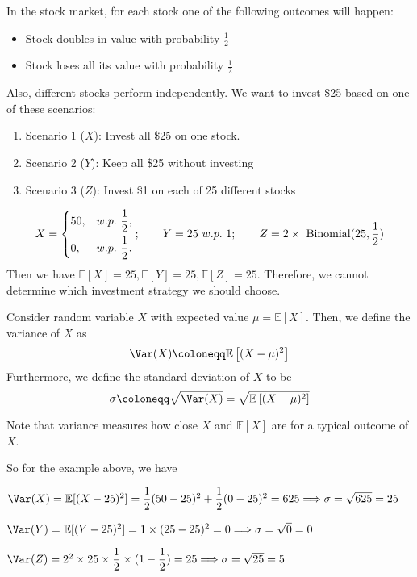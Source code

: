 In the stock market, for each stock one of the following outcomes will happen:
\begin{itemize}
    \item Stock doubles in value with probability \(\frac{1}{2}\) 
    \item Stock loses all its value with probability \(\frac{1}{2}\) 
\end{itemize}
Also, different stocks perform independently. We want to invest \$25 based on one of these scenarios:
\begin{enumerate}
    \item Scenario 1 (\(X\)): Invest all \$25 on one stock. 
    \item Scenario 2 (\(Y\)): Keep all \$25 without investing
    \item Scenario 3 (\(Z\)): Invest \$1 on each of 25 different stocks
\end{enumerate}
\[
    X = \begin{dcases}
        50, & w.p.\ \frac{1}{2}  ,\\
        0, & w.p.\ \frac{1}{2}  .
    \end{dcases};
    \quad\quad 
    Y = 25\ w.p.\ 1;
    \quad\quad 
    Z = 2 \times \ \text{Binomial}(25, \frac{1}{2})
\]
Then we have \(\mathbb{E}[X] = 25, \mathbb{E}[Y] = 25, \mathbb{E}[Z] = 25 \). Therefore, we cannot determine which investment strategy we should choose. 

\begin{definition}
    Consider random variable \(X\) with expected value \(\mu = \mathbb{E}[X]\). Then, we define the variance of \(X\) as
    \[
        \Var(X) \coloneqq \mathbb{E}\left[(X - \mu)^2 \right] 
    \]
    Furthermore, we define the standard deviation of \(X\) to be
    \[
        \sigma \coloneqq \sqrt{\Var(X)} =  \sqrt{\mathbb{E}\left[(X - \mu)^2 \right]} 
    \]
\end{definition}

Note that variance measures how close \(X\) and \(\mathbb{E}[X]\) are for a typical outcome of \(X\).

So for the example above, we have 

\(\Var(X) = \mathbb{E}[(X - 25)^2] = \dfrac{1}{2}(50 - 25)^2 + \dfrac{1}{2} (0 - 25)^2 = 625 \Longrightarrow \sigma = \sqrt{625} = 25\) 

\(\Var(Y) = \mathbb{E}[(Y - 25)^2] = 1 \times (25 - 25)^2 = 0 \Longrightarrow \sigma = \sqrt{0} = 0\) 

\(\Var(Z) = 2^2 \times 25 \times \dfrac{1}{2} \times (1 - \dfrac{1}{2}) = 25 \Longrightarrow \sigma = \sqrt{25} = 5\) 


